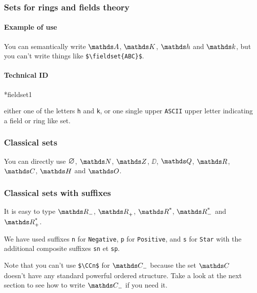 \documentclass[12pt,a4paper]{article}
\makeatletter
\newcommand\ascii{\texttt{ASCII}}
\theoremstyle{definition}
\newcommand\IDmacro{\@ifstar{\@IDmacroStar}{\@IDmacroNoStar}}
\newcommand\@IDmacroNoStar[3]{%
        \texttt{%
        	\textbackslash#1%
        	\IfStrEq{#2}{0}{}{%
        		\,\,[#2 Option%
				\IfStrEq{#2}{1}{}{s}]%
			}%
    	    \IfStrEq{#3}{}{}{%
	    		\,\,(#3 Argument%
				\IfStrEq{#3}{1}{}{s})%
			}
	   	}
        \immediate\write\tempfile{macro@#1@#2@#3}%
    }
\newcommand\@IDmacroStar[2]{%
        \@IDmacroNoStar{#1}{0}{#2}%
    }
\newcommand\@IDoptarg{\@ifstar{\@IDoptargStar}{\@IDoptargNoStar}}
\newcommand\@IDoptargStar[2]{%
    	\vspace{0.5em}
		--- \texttt{#1%
			\IfStrEq{#2}{}{:}{\,#2:}%
		}%
	}
\newcommand\@IDoptargNoStar[2]{%
    	\IfStrEq{#2}{}{%
			\@IDoptargStar{#1}{}%
		}{%
			\@IDoptargStar{#1}{\##2}%
		}%
	}
\newcommand\IDarg[1]{%
    	\@IDoptarg{Argument}{#1}%
	}
\makeatother
\begin{document}
    \subsubsection{Sets for rings and fields theory}

        \paragraph{Example of use}

\begin{tcblisting}{}
You can semantically write $\fieldset{A}$, $\fieldset{K}$, $\fieldset{h}$ and
$\fieldset{k}$, but you can't write things like \verb+$\fieldset{ABC}$+.
\end{tcblisting}


        \paragraph{Technical ID}

\IDmacro*{fieldset}{1}

\IDarg{} either one of the letters \texttt{h} and \texttt{k}, or one single upper \ascii{} upper letter indicating a field or ring like set.



    \subsubsection{Classical sets}

\begin{tcblisting}{}
You can directly use $\nullset$, $\NN$, $\ZZ$, $\DD$, $\QQ$, $\RR$, $\CC$, $\HH$
and $\OO$.
\end{tcblisting}



    \subsubsection{Classical sets with suffixes}

\begin{tcblisting}{}
It is easy to type $\RRn$, $\RRp$, $\RRs$, $\RRsn$ and $\RRsp$.
\end{tcblisting}


We have used suffixes \verb+n+ for \verb+Negative+, \verb+p+ for \verb+Positive+, and \verb+s+ for \verb+Star+ with the additional composite suffixes \verb+sn+ et \verb+sp+.

\medskip

Note that you can't use \verb+$\CCn$+ for $\specialset{\CC}{n}$ because the set $\CC$ doesn't have any standard powerful ordered structure. Take a look at the next section to see how to write $\specialset{\CC}{n}$ if you need it.
\end{document}
